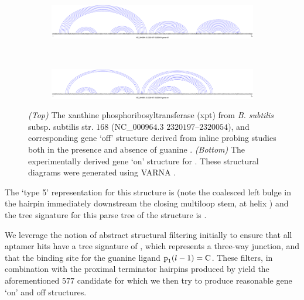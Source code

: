 \begin{figure}[!ht]
\centering
\begin{subfigure}[h]{\textwidth}
\centering
\includegraphics[width=.9\textwidth]{Figures/Ribofinder/NC_000964_3_2320197_2320054_OFF.pdf}
\end{subfigure} \\
\medskip
\begin{subfigure}[h]{\textwidth}
\centering
\includegraphics[width=.9\textwidth]{Figures/Ribofinder/NC_000964_3_2320197_2320054_ON.pdf}
\end{subfigure}
\caption[The xanthine phosphoribosyltransferase (xpt) \grb from
{\em B. subtilis} subsp. subtilis str. $168$ (NC\_$000964.3$ $2320197$--$2320054$),
and corresponding gene `off' and `on' structures]{{\em (Top)} The xanthine phosphoribosyltransferase (xpt) \grb from
{\em B. subtilis} subsp. subtilis str. $168$ (NC\_$000964.3$ $2320197$--$2320054$),
and corresponding gene `off' structure derived from inline probing studies both in
the presence and absence of guanine \citep{mandal2003}. {\em (Bottom)} The
experimentally
derived gene `on' structure for \Bsxpt. These structural diagrams were generated
using VARNA \citep{darty:2009gt}.}
\label{fig:rfinder:xptOff}
\end{figure}

The \rshapes \citep{janssen:2015cq} `type 5' representation for this structure is
\ms{[[][]][][]} (note the coalesced left bulge in the hairpin immediately
downstream the closing multiloop stem, at helix ) and the tree
signature for this parse tree of the structure is \ms{[0,1,2,2,1,1]}.

We leverage the notion of abstract structural filtering initially to ensure that
all \infernal aptamer hits have a tree signature of \ms{[0,1,2,2]}, which
represents a three-way junction, and that the binding site for the guanine ligand
${\text{\mbox{\tt p}}}_{\text{1}}(l - 1) = \text{C}$. These filters, in combination with the
proximal terminator hairpins produced by \tthp yield the aforementioned $577$
candidate \grbs for which we then try to produce reasonable gene `on' and off
structures.

